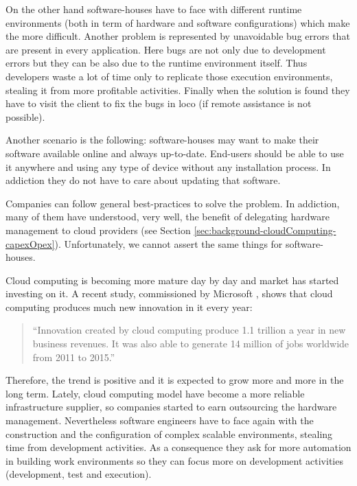 On the other hand software-houses have to face with different runtime environments (both in term of
hardware and software configurations) which make the  more difficult.
Another problem is represented by unavoidable bug errors that are present in every application. Here
bugs are not only due to development errors but they can be also due to the runtime environment itself.
Thus developers waste a lot of time only to replicate those execution environments, stealing it from
more profitable activities. Finally when the solution is found they have to visit the client to fix
the bugs in loco (if remote assistance is not possible).

Another scenario is the following: software-houses may want to make their software available online
and always up-to-date. End-users should be able to use it anywhere and using any type of device without
any installation process. In addiction they do not have to care about updating that software.

Companies can follow general best-practices to solve the problem. In addiction, many of them have
understood, very well, the benefit of delegating hardware management to cloud providers (see Section
\ref{sec:background-cloudComputing-capexOpex}). Unfortunately, we cannot assert the same things for
software-houses.

Cloud computing is becoming more mature day by day and market has started investing on it. A recent
study, commissioned by Microsoft \cite{microsftCloudNewJob}, shows that cloud computing produces much
new innovation in \acs{it} every year:

\begin{center}
	\begin{quote}
		``Innovation created by cloud computing produce \textdollar{}1.1 trillion a year in new
		business revenues. It was also able to generate 14 million of jobs worldwide from 2011 to 2015.''
	\end{quote}
\end{center}

Therefore, the trend is positive and it is expected to grow more and more in the long term.
Lately, cloud computing model have become a more reliable infrastructure supplier, so companies 
started to earn outsourcing the hardware management. Nevertheless software engineers have to face
again with the construction and the configuration of complex scalable environments, stealing time from
development activities. As a consequence they ask for more automation in building work environments so
they can focus more on development activities (development, test and execution).

